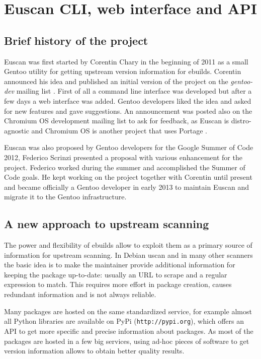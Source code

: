 \chapter{Euscan CLI, web interface and API}

\section{Brief history of the project}

Euscan was first started by Corentin Chary in the beginning of 2011 as a small Gentoo utility for getting upstream version information for ebuilds. Corentin announced his idea and published an initial version of the project on the \emph{gentoo-dev} mailing list \cite{euscan_announcement}.
First of all a command line interface was developed but after a few days a web interface was added. Gentoo developers liked the idea and asked for new features and gave suggestions. An announcement was posted also on the Chromium OS development mailing list to ask for feedback, as Euscan is distro-agnostic and Chromium OS is another project that uses Portage \cite{euscan_chromium}.

Euscan was also proposed by Gentoo developers for the Google Summer of Code 2012, Federico Scrinzi presented a proposal with various enhancement for the project. Federico worked during the summer and accomplished the Summer of Code goals. He kept working on the project together with Corentin until present and became officially a Gentoo developer in early 2013 to maintain Euscan and migrate it to the Gentoo infrastructure.


\section{A new approach to upstream scanning}
The power and flexibility of ebuilds allow to exploit them as a primary source of information for upstream scanning. In Debian uscan and in many other scanners the basic idea is to make the maintainer provide additional information for keeping the package up-to-date: usually an URL to scrape and a regular expression to match. This requires more effort in package creation, causes redundant information and is not always reliable.

Many packages are hosted on the same standardized service, for example almost all Python libraries are available on PyPi (\texttt{http://pypi.org}), which offers an API to get more specific and precise information about packages. As most of the packages are hosted in a few big services, using ad-hoc pieces of software to get version information allows to obtain better quality results.

